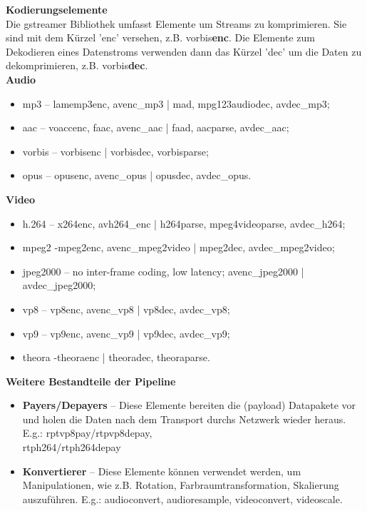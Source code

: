 \textbf{Kodierungselemente}\\
Die gstreamer Bibliothek umfasst Elemente um Streams zu komprimieren. Sie sind mit dem Kürzel 'enc' versehen, z.B. vorbis\textbf{enc}. Die Elemente zum Dekodieren eines Datenstroms verwenden dann das Kürzel 'dec' um die Daten zu dekomprimieren, z.B. vorbis\textbf{dec}.\\

\textbf{Audio}
\begin{itemize}
\item mp3 – lamemp3enc, avenc\_mp3 | mad, mpg123audiodec, avdec\_mp3; 
\item aac – voaccenc, faac, avenc\_aac | faad, aacparse, avdec\_aac;
\item vorbis – vorbisenc | vorbisdec, vorbisparse;
\item opus – opusenc, avenc\_opus | opusdec, avdec\_opus.
\end{itemize}

\textbf{Video}
\begin{itemize}
\item h.264 – x264enc, avh264\_enc |  h264parse, mpeg4videoparse, avdec\_h264;
\item mpeg2 -mpeg2enc, avenc\_mpeg2video | mpeg2dec, avdec\_mpeg2video;
\item jpeg2000 – no inter-frame coding, low latency; avenc\_jpeg2000 | avdec\_jpeg2000;
\item vp8 – vp8enc, avenc\_vp8 | vp8dec, avdec\_vp8;
\item vp9 – vp9enc, avenc\_vp9 | vp9dec, avdec\_vp9;
\item theora -theoraenc | theoradec, theoraparse.
\end{itemize}


\textbf{Weitere Bestandteile der Pipeline}
\begin{itemize}
\item \textbf{Payers/Depayers} – Diese Elemente bereiten die (payload) Datapakete vor und holen die Daten nach dem Transport durchs Netzwerk wieder heraus. E.g.: rptvp8pay/rtpvp8depay, \\ rtph264/rtph264depay
\item \textbf{Konvertierer} – Diese Elemente können verwendet werden, um Manipulationen, wie z.B. Rotation, Farbraumtransformation, Skalierung auszuführen.
E.g.: audioconvert, audioresample, videoconvert, videoscale.
\end{itemize}
\color{black}
